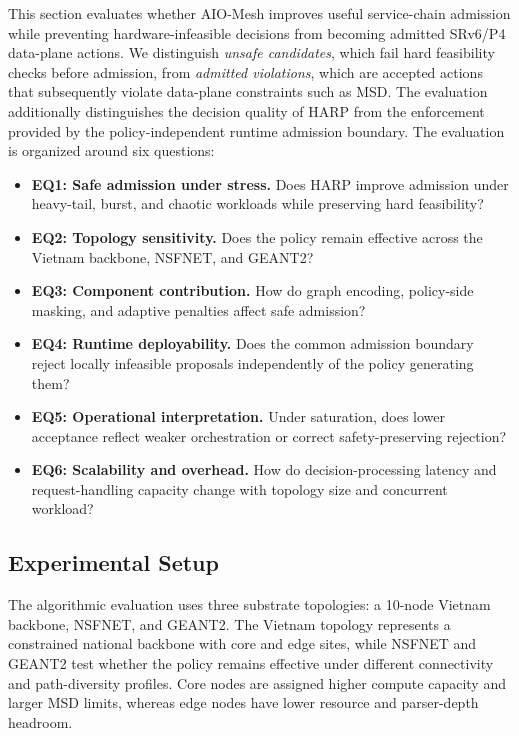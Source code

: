 \documentclass[final,5p]{elsarticle}
\newcommand{\rev}[1]{\textcolor{BrickRed}{#1}}
\begin{document}
This section evaluates whether AIO-Mesh improves useful service-chain admission while preventing hardware-infeasible decisions from becoming admitted SRv6/P4 data-plane actions. We distinguish \textit{unsafe candidates}, which fail hard feasibility checks before admission, from \textit{admitted violations}, which are accepted actions that subsequently violate data-plane constraints such as MSD. \rev{The evaluation additionally distinguishes the decision quality of HARP from the enforcement provided by the policy-independent runtime admission boundary.} The evaluation is organized around six questions:
\begin{itemize}
\item \textbf{EQ1: Safe admission under stress.} Does HARP improve admission under heavy-tail, burst, and chaotic workloads while preserving hard feasibility?
\item \textbf{EQ2: Topology sensitivity.} Does the policy remain effective across the Vietnam backbone, NSFNET, and GEANT2?
\item \textbf{EQ3: Component contribution.} How do graph encoding, policy-side masking, and adaptive penalties affect safe admission?
\item \textbf{EQ4: Runtime deployability.} \rev{Does the common admission boundary reject locally infeasible proposals independently of the policy generating them?}
\item \textbf{EQ5: Operational interpretation.} Under saturation, does lower acceptance reflect weaker orchestration or correct safety-preserving rejection?
\item \textbf{EQ6: Scalability and overhead.} \rev{How do decision-processing latency and request-handling capacity change with topology size and concurrent workload?}
\end{itemize}

\subsection{Experimental Setup}
\label{subsec:experimental_setup}

The algorithmic evaluation uses three substrate topologies: a 10-node Vietnam backbone, NSFNET, and GEANT2. The Vietnam topology represents a constrained national backbone with core and edge sites, while NSFNET and GEANT2 test whether the policy remains effective under different connectivity and path-diversity profiles. Core nodes are assigned higher compute capacity and larger MSD limits, whereas edge nodes have lower resource and parser-depth headroom.
\end{document}
